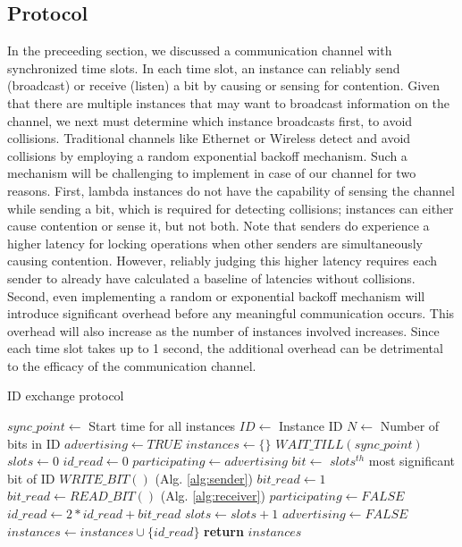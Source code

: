 \subsection{Protocol}
\label{sec:protocol}
In the preceeding section, we discussed a communication channel with
synchronized time slots. In each time slot, an instance can reliably send
(broadcast) or receive (listen) a bit by causing or sensing for contention.
Given that there are multiple instances that may want to broadcast information
on the channel, we next must determine which instance broadcasts first, to avoid
collisions.  Traditional channels like Ethernet or Wireless detect and avoid
collisions by employing a random exponential backoff mechanism.
Such a mechanism will be challenging to implement in case of our channel for two
reasons. First, lambda instances do not have the capability of sensing the
channel while sending a bit, which is required for detecting collisions;
instances can either cause contention or sense it, but not both. Note that
senders do experience a higher latency for locking operations when other senders
are simultaneously causing contention. However, reliably judging this higher
latency requires each sender to already have calculated a baseline of latencies
without collisions. Second, even implementing a
random or exponential backoff mechanism will introduce significant overhead before any
meaningful communication occurs. This overhead will also increase as the number
of instances involved increases. Since each time slot takes up to 1 second, the
additional overhead can be detrimental to the efficacy of the communication
channel.


\begin{algorithm}[!t]
\caption{ID exchange protocol }
\label{alg:protcol}
\begin{algorithmic}[1]
\STATE $sync\_point \leftarrow$ {Start time for all instances}
\STATE $ID \leftarrow$ {Instance ID}
\STATE $N \leftarrow$ {Number of bits in ID}
\STATE $advertising \leftarrow TRUE$
\STATE $instances \leftarrow \{\} $
\STATE $WAIT\_TILL(sync\_point)$
    \STATE $slots \leftarrow 0$
    \STATE $id\_read \leftarrow 0$
    \STATE $participating \leftarrow advertising$
        \STATE $bit \leftarrow$ {$slots^{th}$ most significant bit of ID}
            \STATE $WRITE\_BIT()$               (Alg. \ref{alg:sender})
            \STATE $bit\_read \leftarrow 1$
        \ELSE
            \STATE $bit\_read \leftarrow READ\_BIT()$       (Alg. \ref{alg:receiver})
                \STATE $participating \leftarrow FALSE$
            \ENDIF
        \ENDIF
        \STATE $id\_read \leftarrow 2 * id\_read + bit\_read$
        \STATE $slots \leftarrow slots + 1$
    \ENDWHILE
        \STATE $advertising \leftarrow FALSE$
    \ENDIF
    \STATE $instances \leftarrow instances \cup \{id\_read\}$
\ENDWHILE
\STATE \textbf{return} $instances$
\end{algorithmic}
\end{algorithm}

